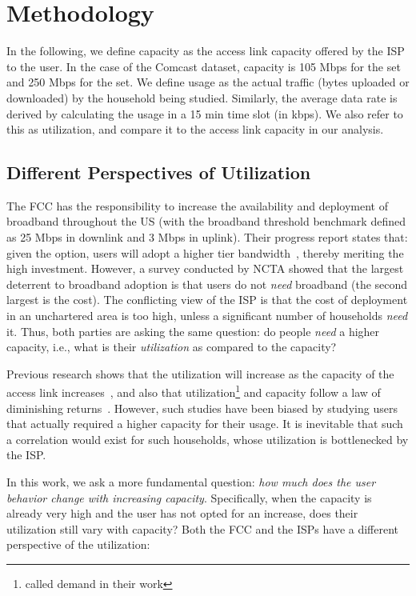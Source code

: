 \section{Methodology}
\label{sec:methodology}

In the following, we define capacity as the access link capacity offered by the 
ISP to the user. In the case of the Comcast dataset, capacity is 105 Mbps for 
the \control set and 250 Mbps for the \test set. We define usage as 
the actual traffic (bytes uploaded or downloaded) by the household being 
studied. Similarly, the average data rate is derived by calculating the 
usage in a 15 min time slot (in kbps). We also refer to this as utilization,
and compare it to the access link capacity in our analysis.

\subsection{Different Perspectives of Utilization}

The FCC has the responsibility to increase the availability and deployment of broadband
throughout the US (with the broadband threshold benchmark defined as 25 Mbps in downlink and
3 Mbps in uplink). Their progress report states that: given the option, users will adopt a
higher tier bandwidth~\cite{}, thereby meriting the high investment. However, a survey
conducted by NCTA showed that the largest deterrent to broadband adoption is that users
do not \emph{need} broadband (the second largest is the cost). The conflicting view of 
the ISP is that the cost of deployment in an unchartered area is too high, unless
a significant number of households \emph{need} it. Thus, both parties are asking the same
question: do people \emph{need} a higher capacity, i.e., what is their \emph{utilization}
as compared to the capacity?

Previous research shows that the utilization will increase as the capacity of the access
link increases~\cite{}, and also that utilization\footnote{called demand in their work} and capacity
follow a law of diminishing returns~\cite{bischof2014broadband-behavior}. However, such
studies have been biased by studying users that actually required a higher capacity
for their usage. It is inevitable that such a correlation would exist for 
such households, whose utilization is bottlenecked by the ISP.

In this work, we ask a more fundamental question: \emph{how much does the user behavior
change with increasing capacity}. Specifically, when the capacity is already very high
and the user has not opted for an increase, does their utilization still vary with capacity?
Both the FCC and the ISPs have a different perspective of the utilization:

